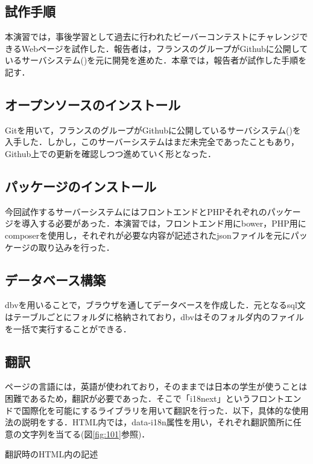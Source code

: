 \documentclass[a4paper]{jarticle}
\makeatletter
\newenvironment{figurehere}
  {\def\@captype{figure}}
  {}
\makeatother
\begin{document}
\begin{multicols}{2}
\section{試作手順}
本演習では，事後学習として過去に行われたビーバーコンテストにチャレンジできるWebページを試作した．報告者は，フランスのグループがGithubに公開しているサーバシステム(\cite{bebras-france-platform})を元に開発を進めた．本章では，報告者が試作した手順を記す．
\subsection{オープンソースのインストール}
Gitを用いて，フランスのグループがGithubに公開しているサーバシステム(\cite{bebras-france-platform})を入手した．しかし，このサーバーシステムはまだ未完全であったこともあり，Github上での更新を確認しつつ進めていく形となった．

\subsection{パッケージのインストール}
今回試作するサーバーシステムにはフロントエンドとPHPそれぞれのパッケージを導入する必要があった．本演習では，フロントエンド用にbower，PHP用にcomposerを使用し，それぞれが必要な内容が記述されたjsonファイルを元にパッケージの取り込みを行った．

\subsection{データベース構築}
dbvを用いることで，ブラウザを通してデータベースを作成した．元となるsql文はテーブルごとにフォルダに格納されており，dbvはそのフォルダ内のファイルを一括で実行することができる．

\subsection{翻訳}
ページの言語には，英語が使われており，そのままでは日本の学生が使うことは困難であるため，翻訳が必要であった．そこで「i18next」というフロントエンドで国際化を可能にするライブラリを用いて翻訳を行った．以下，具体的な使用法の説明をする．HTML内では，data-i18n属性を用い，それぞれ翻訳箇所に任意の文字列を当てる(図\ref{fig:101}参照)．

\begin{figurehere}
\begin{center}
\end{center}
\caption{翻訳時のHTML内の記述}\label{fig:101}
\end{figurehere}


\end{multicols}
\end{document}
